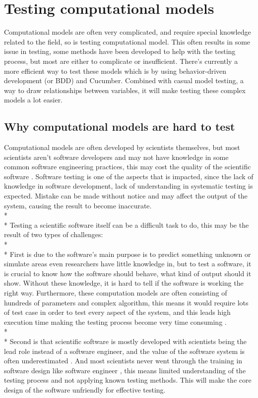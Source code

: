 \section{Testing computational models}
Computational models are often very complicated, and require special knowledge related to the field, so is testing computational model. This often results in some issue in testing, some methods have been developed to help with the testing process, but most are either to complicate or insufficient. There’s currently a more efficient way to test these models which is by using behavior-driven development (or BDD) and Cucumber. Combined with casual model testing, a way to draw relationships between variables, it will make testing these complex models a lot easier.

\subsection{Why computational models are hard to test}
Computational models are often developed by scientists themselves, but most scientists aren’t software developers and may not have knowledge in some common software engineering practices, this may cost the quality of the scientific software \cite{Reference10}. Software testing is one of the aspects that is impacted, since the lack of knowledge in software development, lack of understanding in systematic testing is expected. Mistake can be made without notice and may affect the output of the system, causing the result to become inaccurate.\\*\\*
Testing a scientific software itself can be a difficult task to do, this may be the result of two types of challenges: \\*\\*
First is due to the software’s main purpose is to predict something unknown or simulate areas even researchers have little knowledge in, but to test a software, it is crucial to know how the software should behave, what kind of output should it show. Without these knowledge, it is hard to tell if the software is working the right way. Furthermore, these computation models are often consisting of hundreds of parameters and complex algorithm, this means it would require lots of test case in order to test every aspect of the system, and this leads high execution time making the testing process become very time consuming \cite{Reference10}.\\*\\*
Second is that scientific software is mostly developed with scientists being the lead role instead of a software engineer, and the value of the software system is often underestimated \cite{Reference10}. And most scientists never went through the training in software design like software engineer \cite{Reference11}, this means limited understanding of the testing process and not applying known testing methods. This will make the core design of the software unfriendly for effective testing.

